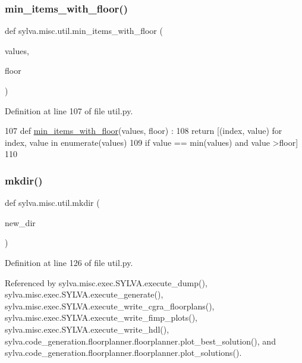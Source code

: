 \subsubsection{\texorpdfstring{min\+\_\+items\+\_\+with\+\_\+floor()}{min\_items\_with\_floor()}}
{\footnotesize\ttfamily def sylva.\+misc.\+util.\+min\+\_\+items\+\_\+with\+\_\+floor (\begin{DoxyParamCaption}\item[{}]{values,  }\item[{}]{floor }\end{DoxyParamCaption})}



Definition at line 107 of file util.\+py.


\begin{DoxyCode}
107 \textcolor{keyword}{def }\hyperlink{namespacesylva_1_1misc_1_1util_a54b027582331f484228cb0a1acac2d90}{min\_items\_with\_floor}(values, floor) :
108   \textcolor{keywordflow}{return} [(index, value) \textcolor{keywordflow}{for} index, value \textcolor{keywordflow}{in} enumerate(values)
109     \textcolor{keywordflow}{if} value == min(values) \textcolor{keywordflow}{and} value >floor]
110 
\end{DoxyCode}
\mbox{\label{namespacesylva_1_1misc_1_1util_af426e429c40209bbb46e3a0e8f139a44}} 
\subsubsection{\texorpdfstring{mkdir()}{mkdir()}}
{\footnotesize\ttfamily def sylva.\+misc.\+util.\+mkdir (\begin{DoxyParamCaption}\item[{}]{new\+\_\+dir }\end{DoxyParamCaption})}



Definition at line 126 of file util.\+py.



Referenced by sylva.\+misc.\+exec.\+S\+Y\+L\+V\+A.\+execute\+\_\+dump(), sylva.\+misc.\+exec.\+S\+Y\+L\+V\+A.\+execute\+\_\+generate(), sylva.\+misc.\+exec.\+S\+Y\+L\+V\+A.\+execute\+\_\+write\+\_\+cgra\+\_\+floorplans(), sylva.\+misc.\+exec.\+S\+Y\+L\+V\+A.\+execute\+\_\+write\+\_\+fimp\+\_\+plots(), sylva.\+misc.\+exec.\+S\+Y\+L\+V\+A.\+execute\+\_\+write\+\_\+hdl(), sylva.\+code\+\_\+generation.\+floorplanner.\+floorplanner.\+plot\+\_\+best\+\_\+solution(), and sylva.\+code\+\_\+generation.\+floorplanner.\+floorplanner.\+plot\+\_\+solutions().


